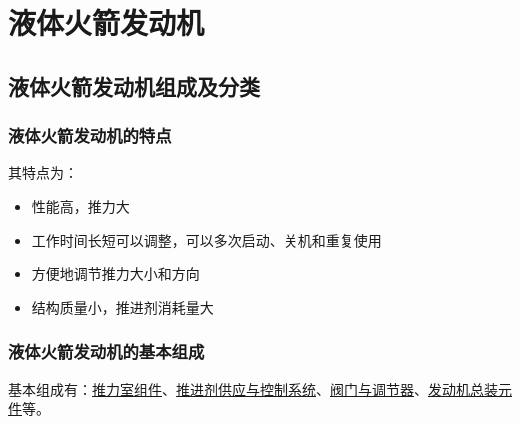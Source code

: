 \chapter{液体火箭发动机}
\thispagestyle{empty}
\section{液体火箭发动机组成及分类}
\subsection{液体火箭发动机的特点}
\vspace*{-1.5em}
\noindent 其特点为：\vspace*{-0.8em}
\begin{itemize}
	\item 性能高，推力大\vspace*{-0.8em}
	\item 工作时间长短可以调整，可以多次启动、关机和重复使用\vspace*{-0.8em}
	\item 方便地调节推力大小和方向\vspace*{-0.8em}
	\item 结构质量小，推进剂消耗量大
\end{itemize}

\subsection{液体火箭发动机的基本组成}
基本组成有：\underline{推力室组件}、\underline{推进剂供应与控制系统}、\underline{阀门与调节器}、\underline{发动机总装元件}等。
\vspace*{0.5em}

